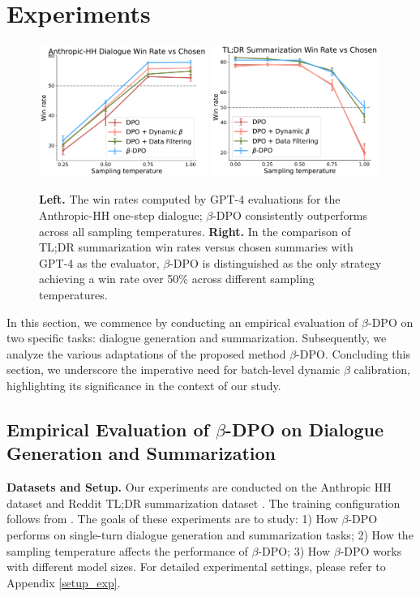 \section{Experiments}
\label{Experiments}
\begin{figure}[t]
    \centering
    \includegraphics[width=0.49\textwidth]{figs/win_rate_hh.pdf}
    \includegraphics[width=0.49\textwidth]{figs/win_rate_tldr.pdf}
    \caption{
    \textbf{Left.} 
    The win rates computed by GPT-4 evaluations for the Anthropic-HH one-step dialogue; $\beta$-DPO consistently outperforms across all sampling temperatures.
    \textbf{Right.} 
    In the comparison of TL;DR summarization win rates versus chosen summaries with GPT-4 as the evaluator, $\beta$-DPO is distinguished as the only strategy achieving a win rate over 50\% across different sampling temperatures.
    }
    \label{fig:dialogue-main}
\end{figure}

In this section, we commence by conducting an empirical evaluation of $\beta$-DPO on two specific tasks: dialogue generation and summarization. Subsequently, we analyze the various adaptations of the proposed method $\beta$-DPO. Concluding this section, we underscore the imperative need for batch-level dynamic $\beta$ calibration, highlighting its significance in the context of our study.

\subsection{Empirical Evaluation of $\beta$-DPO on Dialogue Generation and Summarization}
\textbf{Datasets and Setup.} Our experiments are conducted on the Anthropic HH dataset \cite{Bai2022training} and Reddit TL;DR summarization dataset \cite{tldr_dataset}. The training configuration follows from \citet{DPO}. The goals of these experiments are to study: 1) How $\beta$-DPO performs on single-turn dialogue generation and summarization tasks; 2) How the sampling temperature affects the performance of $\beta$-DPO; 3) How $\beta$-DPO works with different model sizes. For detailed experimental settings, please refer to Appendix \ref{setup_exp}.

